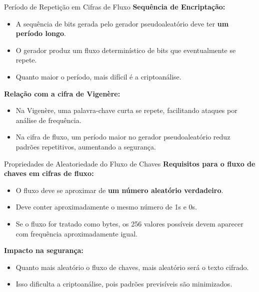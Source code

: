 \begin{frame}{Período de Repetição em Cifras de Fluxo}
    \textbf{Sequência de Encriptação:}
    \begin{itemize}
        \item A sequência de bits gerada pelo gerador pseudoaleatório deve ter \textbf{um período longo}.
        \item O gerador produz um fluxo determinístico de bits que eventualmente se repete.
        \item Quanto maior o período, mais difícil é a criptoanálise.
    \end{itemize}

    \textbf{Relação com a cifra de Vigenère:}
    \begin{itemize}
        \item Na Vigenère, uma palavra-chave curta se repete, facilitando ataques por análise de frequência.
        \item Na cifra de fluxo, um período maior no gerador pseudoaleatório reduz padrões repetitivos, aumentando a segurança.
    \end{itemize}
\end{frame}

\begin{frame}{Propriedades de Aleatoriedade do Fluxo de Chaves}
    \textbf{Requisitos para o fluxo de chaves em cifras de fluxo:}
    \begin{itemize}
        \item O fluxo deve se aproximar de \textbf{um número aleatório verdadeiro}.
        \item Deve conter aproximadamente o mesmo número de 1s e 0s.
        \item Se o fluxo for tratado como bytes, os 256 valores possíveis devem aparecer com frequência aproximadamente igual.
    \end{itemize}

    \textbf{Impacto na segurança:}
    \begin{itemize}
        \item Quanto mais aleatório o fluxo de chaves, mais aleatório será o texto cifrado.
        \item Isso dificulta a criptoanálise, pois padrões previsíveis são minimizados.
    \end{itemize}
\end{frame}


